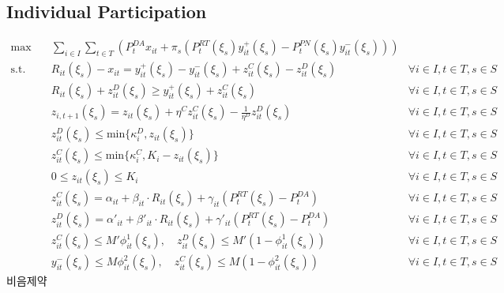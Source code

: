 \documentclass[10pt]{article}
\begin{document}
\subsection{Individual Participation}
\begin{subequations}
    \begin{align}
        \text{max} \quad &\sum_{i\in I}\sum_{t\in T}\left(P_t^{DA} x_{it} + \pi_s\left(P_t^{RT}(\xi_s) y^+_{it}(\xi_s) - P_t^{PN}(\xi_s) y^-_{it}(\xi_s)\right) \right) \\   
        \text{s.t.} \quad 
        & R_{it}(\xi_s) - x_{it} = y_{it}^{+}(\xi_s) - y_{it}^{-}(\xi_s) + z^C_{it}(\xi_s) - z^D_{it}(\xi_s) & \forall i \in I, t \in T, s \in S \\
        & R_{it}(\xi_s) + z^D_{it}(\xi_s) \geq y^+_{it}(\xi_s) + z^C_{it}(\xi_s) & \forall i \in I, t \in T, s \in S \\
        & z_{i,t+1}(\xi_s) = z_{it}(\xi_s) + \eta^C z^C_{it}(\xi_s) - \frac{1}{\eta^D} z^D_{it}(\xi_s) & \forall i \in I, t \in T, s \in S \\
        & z^D_{it}(\xi_s) \le \text{min} \{\kappa_{i}^D, z_{it}(\xi_s) \} & \forall i \in I, t \in T, s \in S \\
        & z^C_{it}(\xi_s) \le \text{min} \{\kappa_{i}^C, K_i - z_{it}(\xi_s) \} & \forall i \in I, t \in T, s \in S \\
        & 0 \leq z_{it}(\xi_s) \leq K_i & \forall i \in I, t \in T, s \in S \\
        & z^C_{it}(\xi_s) = \alpha_{it} + \beta_{it} \cdot R_{it}(\xi_s) + \gamma_{it}\left(P_{t}^{RT}(\xi_s)-P_{t}^{DA}\right) & \forall i \in I, t \in T, s \in S \\
        & z^D_{it}(\xi_s) = \alpha'_{it} + \beta'_{it} \cdot R_{it}(\xi_s) + \gamma'_{it}\left(P_{t}^{RT}(\xi_s)-P_{t}^{DA}\right) & \forall i \in I, t \in T, s \in S \\
        & z^C_{it}(\xi_s) \leq M' \phi^1_{it}(\xi_s), \quad z^D_{it}(\xi_s) \leq M' (1 - \phi^1_{it}(\xi_s)) & \forall i \in I, t \in T, s \in S \\
        & y^-_{it}(\xi_s) \leq M \phi^2_{it}(\xi_s), \quad z^C_{it}(\xi_s) \leq M (1 - \phi^2_{it}(\xi_s)) & \forall i \in I, t \in T, s \in S
    \end{align}
\end{subequations}
비음제약
\end{document}
